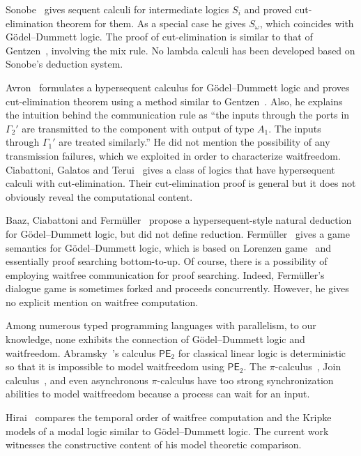 Sonobe~\cite{sonobe} gives sequent calculi for intermediate logics $S_i$
and proved cut-elimination theorem for them.  As a special case he gives
$S_\omega$, which coincides with G\"odel--Dummett logic.
The proof of cut-elimination is similar to that of
Gentzen~\cite{gentzen}, involving the mix rule.
No lambda calculi has been developed based on Sonobe's deduction system.

Avron~\cite{avron91} formulates a
hypersequent calculus for G\"odel--Dummett logic and proves
cut-elimination theorem using a method
similar to Gentzen~\cite{gentzen}.
Also, he explains the intuition behind the communication rule as
``the inputs through the ports in $\Gamma_2'$ are transmitted to the
component with output of type $A_1.$  The inputs through $\Gamma_1'$ are
treated similarly.''  He did not mention the possibility of
any transmission failures, which we exploited
in order to characterize waitfreedom.
Ciabattoni, Galatos and Terui~\cite{alg} gives a class of logics
that have hypersequent calculi with cut-elimination.
Their cut-elimination proof is general but it does not
obviously reveal the computational content.

Baaz, Ciabattoni and Ferm\"uller~\cite{natural} propose a
hypersequent-style natural deduction for G\"odel--Dummett logic, but
did not define reduction.
Ferm\"uller~\cite{parallel} gives a game semantics for G\"odel--Dummett
logic, which is based on Lorenzen game~\cite{curryhoward} and essentially
proof searching bottom-to-up.
Of course, there is a possibility of employing waitfree communication
for proof searching. Indeed, Ferm\"uller's dialogue game is
sometimes forked and proceeds concurrently.
However, he gives no explicit mention on waitfree computation.

Among numerous typed programming languages with parallelism,
to our knowledge, none exhibits
the connection of G\"odel--Dummett logic and waitfreedom.
Abramsky~\cite{abramsky1993computational}'s calculus $\mathsf{PE}_2$
for classical linear logic is
deterministic
\cite[Theorem~7.9]{abramsky1993computational} so that it is
impossible to model
waitfreedom using $\mathsf{PE}_2$.
The $\pi$-calculus~\cite{milner1999communicating},
Join calculus~\cite{join},
and even asynchronous
$\pi$-calculus \cite{hondatokoro}
have too strong synchronization abilities to model waitfreedom because
a process can wait for an input.

Hirai~\cite{hirailpar} compares the temporal order of waitfree
computation and the Kripke models of a modal logic similar to
G\"odel--Dummett logic.  The current
work witnesses the constructive content of
his model theoretic comparison.


